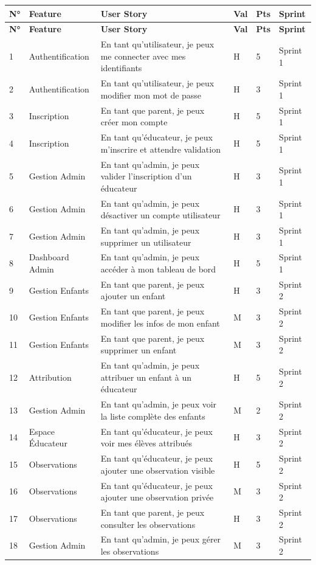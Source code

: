 \documentclass[12pt,a4paper]{report}
\begin{document}
\begin{longtable}{|p{0.5cm}|p{3cm}|p{6cm}|p{1cm}|p{1cm}|p{1.5cm}|}
\hline
\textbf{N°} & \textbf{Feature} & \textbf{User Story} & \textbf{Val} & \textbf{Pts} & \textbf{Sprint} \\
\hline
\endfirsthead
\hline
\textbf{N°} & \textbf{Feature} & \textbf{User Story} & \textbf{Val} & \textbf{Pts} & \textbf{Sprint} \\
\hline
\endhead

1 & Authentification & En tant qu'utilisateur, je peux me connecter avec mes identifiants & H & 5 & Sprint 1 \\
\hline
2 & Authentification & En tant qu'utilisateur, je peux modifier mon mot de passe & H & 3 & Sprint 1 \\
\hline
3 & Inscription & En tant que parent, je peux créer mon compte & H & 5 & Sprint 1 \\
\hline
4 & Inscription & En tant qu'éducateur, je peux m'inscrire et attendre validation & H & 5 & Sprint 1 \\
\hline
5 & Gestion Admin & En tant qu'admin, je peux valider l'inscription d'un éducateur & H & 3 & Sprint 1 \\
\hline
6 & Gestion Admin & En tant qu'admin, je peux désactiver un compte utilisateur & H & 3 & Sprint 1 \\
\hline
7 & Gestion Admin & En tant qu'admin, je peux supprimer un utilisateur & H & 3 & Sprint 1 \\
\hline
8 & Dashboard Admin & En tant qu'admin, je peux accéder à mon tableau de bord & H & 5 & Sprint 1 \\
\hline

9 & Gestion Enfants & En tant que parent, je peux ajouter un enfant & H & 3 & Sprint 2 \\
\hline
10 & Gestion Enfants & En tant que parent, je peux modifier les infos de mon enfant & M & 3 & Sprint 2 \\
\hline
11 & Gestion Enfants & En tant que parent, je peux supprimer un enfant & M & 3 & Sprint 2 \\
\hline
12 & Attribution & En tant qu'admin, je peux attribuer un enfant à un éducateur & H & 5 & Sprint 2 \\
\hline
13 & Gestion Admin & En tant qu'admin, je peux voir la liste complète des enfants & M & 2 & Sprint 2 \\
\hline
14 & Espace Éducateur & En tant qu'éducateur, je peux voir mes élèves attribués & H & 3 & Sprint 2 \\
\hline
15 & Observations & En tant qu'éducateur, je peux ajouter une observation visible & H & 5 & Sprint 2 \\
\hline
16 & Observations & En tant qu'éducateur, je peux ajouter une observation privée & M & 3 & Sprint 2 \\
\hline
17 & Observations & En tant que parent, je peux consulter les observations & H & 3 & Sprint 2 \\
\hline
18 & Gestion Admin & En tant qu'admin, je peux gérer les observations & M & 3 & Sprint 2 \\
\hline


\end{longtable}
\end{document}
